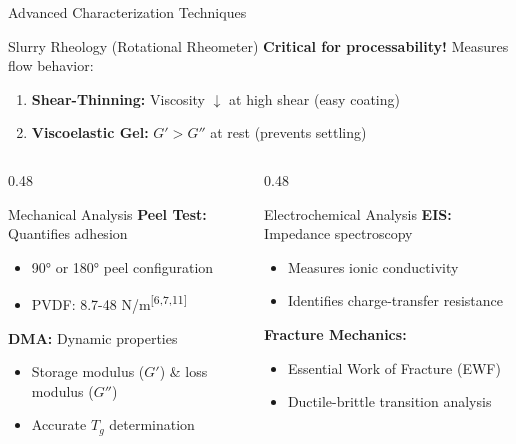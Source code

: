 \documentclass[aspectratio=169]{beamer}
\begin{document}
\begin{frame}{Advanced Characterization Techniques}
    \begin{block}{Slurry Rheology (Rotational Rheometer)}
        \textbf{Critical for processability!} Measures flow behavior:
        \begin{enumerate}
            \item \textbf{Shear-Thinning:} Viscosity $\downarrow$ at high shear (easy coating)
            \item \textbf{Viscoelastic Gel:} $G' > G''$ at rest (prevents settling)
        \end{enumerate}
    \end{block}
    
    \begin{columns}[T]
        \begin{column}{0.48\textwidth}
            \begin{block}{Mechanical Analysis}
                \textbf{Peel Test:} Quantifies adhesion
                \begin{itemize}\small
                    \item 90° or 180° peel configuration
                    \item PVDF: 8.7-48 N/m\textsuperscript{[6,7,11]}
                \end{itemize}
                \textbf{DMA:} Dynamic properties
                \begin{itemize}\small
                    \item Storage modulus ($G'$) \& loss modulus ($G''$)
                    \item Accurate $T_g$ determination
                \end{itemize}
            \end{block}
        \end{column}
        
        \begin{column}{0.48\textwidth}
            \begin{block}{Electrochemical Analysis}
                \textbf{EIS:} Impedance spectroscopy
                \begin{itemize}\small
                    \item Measures ionic conductivity
                    \item Identifies charge-transfer resistance
                \end{itemize}
                \textbf{Fracture Mechanics:}
                \begin{itemize}\small
                    \item Essential Work of Fracture (EWF)
                    \item Ductile-brittle transition analysis
                \end{itemize}
            \end{block}
        \end{column}
    \end{columns}
\end{frame}
\end{document}
